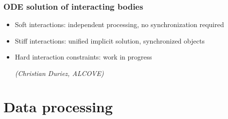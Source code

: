 \documentclass[a4paper,compress]{beamer}
\begin{document}
\begin{frame}
\frametitle{ODE solution of interacting bodies}
\begin{itemize}
\item<1-> Soft interactions: independent processing, no synchronization required\\
\item<2-> Stiff interactions: unified implicit solution, synchronized objects\\
\item<3-> Hard interaction constraints: work in progress  \begin{small}\textit{(Christian Duriez, ALCOVE)}\end{small}
\end{itemize}
\end{frame}




\section{Data processing}
\end{document}

